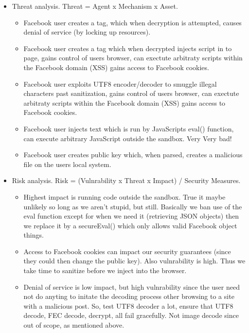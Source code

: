         \begin{itemize}
            \item Threat analysis. Threat = Agent x Mechanism x Asset.
            \begin{itemize}
                \item Facebook user creates a tag, which when decryption is attempted, causes denial of service (by locking up resources).
                \item Facebook user creates a tag which when decrypted injects script in to page, gains control of users browser, can exectute arbitraty scripts within the Facebook domain (XSS) gains access to Facebook cookies.
                \item Facebook user exploits UTF8 encoder/decoder to smuggle illegal characters past sanitization, gains control of users browser, can exectute arbitraty scripts within the Facebook domain (XSS) gains access to Facebook cookies.
                \item Facebook user injects text which is run by JavaScripts eval() function, can execute arbitrary JavaScript outside the sandbox. Very Very bad!
                \item Facebook user creates public key which, when parsed, creates a malicious file on the users local system.
            \end{itemize}
            \item Risk analysis. Risk = (Vulnrability x Threat x Impact) / Security Measures.
            \begin{itemize}
                \item Highest impact is running code outside the sandbox. True it maybe unlikely so long as we aren't stupid, but still. Basically we ban use of the eval function except for when we need it (retrieving JSON objects) then we replace it by a secureEval() which only allows valid Facebook object things.
                \item Access to Facebook cookies can impact our security guarantees (since they could then change the public key). Also vulnrability is high. Thus we take time to sanitize before we inject into the browser.
                \item Denial of service is low impact, but high vulnrability since the user need not do anyting to initate the decoding process other browsing to a site with a malicious post. So, test UTF8 decoder a lot, ensure that UTF8 decode, FEC decode, decrypt, all fail gracefully. Not image decode since out of scope, as mentioned above.

\end{itemize}
\end{itemize}
